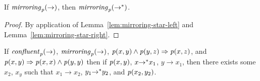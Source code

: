 \documentclass[numbers,10pt,preprint\ifanon ,nocopyrightspace\fi]{sigplanconf}
\begin{document}
\begin{lemma}
  \label{lem:mirroring-star}
  If $\mathit{mirroring}_{\mathit{p}}(\rightarrow)$, then
  $\mathit{mirroring}_{\mathit{p}}({\rightarrow}^*)$.
\end{lemma}
\begin{proof}
  By application of Lemma~\ref{lem:mirroring-star-left} and
  Lemma~\ref{lem:mirroring-star-right}.
\end{proof}

\begin{lemma}
  \label{lem:pre-starred-confluence-propagator-like}
  If $\mathit{confluent}_{\mathit{p}}(\rightarrow)$,
  $\mathit{mirroring}_{\mathit{p}}(\rightarrow)$,
  $\mathit{p}(x,y) \wedge \mathit{p}(y,z) \Rightarrow
  \mathit{p}(x,z)$, and
  $\mathit{p}(x,y) \Rightarrow \mathit{p}(x,x) \wedge \mathit{p}(y,y)$
  then if $\mathit{p}(x,y)$, $x{\rightarrow}^* x_1$, $y\rightarrow
  x_1$, then there exists some $x_2$, $x_y$ such that
  $x_1\rightarrow x_2$, $y_1{\rightarrow}^* y_2$, and
  $\mathit{p}(x_2,y_2)$.
\end{lemma}
\end{document}
